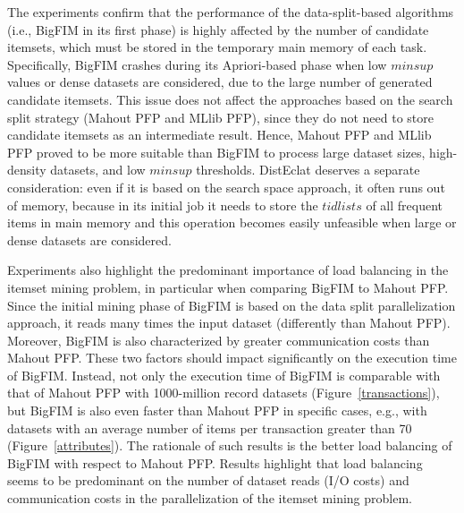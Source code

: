 \documentclass[preprint,review,12pt]{elsarticle}
\begin{document}
The experiments confirm that the performance of the data-split-based algorithms
(i.e., BigFIM in its first phase) is highly affected by the number of candidate itemsets, 
which must be stored in the temporary main memory of each task. 
Specifically, BigFIM crashes during its Apriori-based phase when low $minsup$ values or dense datasets are considered,
due to the large number of generated candidate itemsets. 
This issue does not affect the approaches based on the search split strategy (Mahout PFP and MLlib PFP), 
since they do not need to store candidate itemsets as an intermediate result.
Hence, Mahout PFP and MLlib PFP proved to be more suitable than BigFIM to process large dataset sizes, high-density datasets, and low $minsup$ thresholds. 
DistEclat deserves a separate consideration: even if it is based on the search space approach, 
it often runs out of memory,
because in its initial job it needs to store the $tidlists$ of all frequent items in main memory 
and this operation becomes easily unfeasible when large or dense datasets are considered. 

Experiments also highlight the predominant importance of load balancing in the itemset mining problem, 
in particular when comparing BigFIM to Mahout PFP. 
Since the initial mining phase of BigFIM is based on the data split parallelization approach,
it reads many times the input dataset (differently than Mahout PFP).
Moreover, BigFIM is also characterized by greater communication costs than Mahout PFP. 
These two factors should impact significantly on the execution time of BigFIM. 
Instead, 
not only the execution time of BigFIM is comparable with that of Mahout PFP 
with 1000-million record datasets (Figure~\ref{transactions}),
but BigFIM is also even faster than Mahout PFP in specific cases, e.g., 
with datasets with an average number of items per transaction greater than 70 (Figure~\ref{attributes}).
The rationale of 	such results is the better load balancing of BigFIM with respect to Mahout PFP. 
Results highlight that load balancing seems to be predominant on the number of dataset reads (I/O costs) and communication costs in the parallelization of the itemset mining problem.
\end{document}

